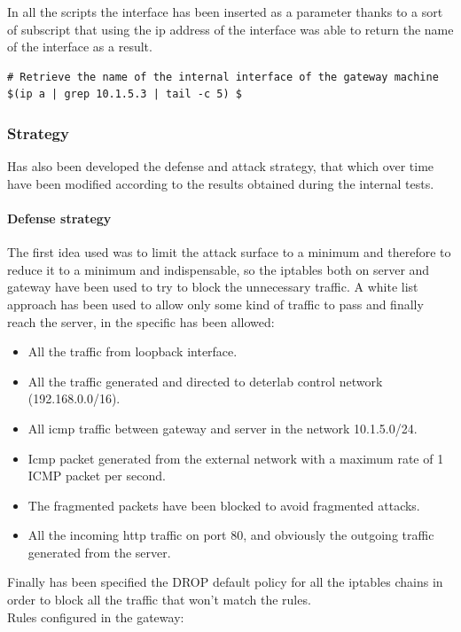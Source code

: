 \documentclass[14pt]{article}
\begin{document}
In all the scripts the interface has been inserted as a parameter thanks to a sort of subscript that using the ip address of the interface was able to return the name of the interface as a result.
\begin{Verbatim}
# Retrieve the name of the internal interface of the gateway machine
$(ip a | grep 10.1.5.3 | tail -c 5) $
\end{Verbatim}

\subsubsection{Strategy}
Has also been developed the defense and attack strategy, that which over time have been modified according to the results obtained during the internal tests.

\paragraph{Defense strategy}
The first idea used was to limit the attack surface to a minimum and therefore to reduce it to a minimum and indispensable, so the iptables both on server and gateway have been used to try to block the unnecessary traffic. A white list approach has been used to allow only some kind of traffic to pass and finally reach the server, in the specific has been allowed:
\begin{itemize}
	\item All the traffic from loopback interface.
	\item All the traffic generated and directed to deterlab control network (192.168.0.0/16).
	\item All icmp traffic between gateway and server in the network 10.1.5.0/24.
	\item Icmp packet generated from the external network with a maximum rate of 1 ICMP packet per second.
	\item The fragmented packets have been blocked to avoid fragmented attacks.
	\item All the incoming http traffic on port 80, and obviously the outgoing traffic generated from the server.
\end{itemize}
Finally has been specified the DROP default policy for all the iptables chains in order to block all the traffic that won't match the rules. 
\\
Rules configured in the gateway:
\end{document}
